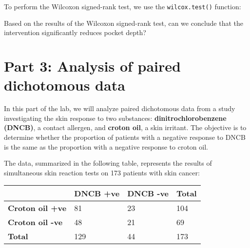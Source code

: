 \documentclass[
  letterpaper,
  DIV=11,
  numbers=noendperiod]{scrartcl}
\newenvironment{Shaded}{\begin{snugshade}}{\end{snugshade}}
\newcommand{\AttributeTok}[1]{\textcolor[rgb]{0.40,0.45,0.13}{#1}}
\newcommand{\CommentTok}[1]{\textcolor[rgb]{0.37,0.37,0.37}{#1}}
\newcommand{\ConstantTok}[1]{\textcolor[rgb]{0.56,0.35,0.01}{#1}}
\newcommand{\FunctionTok}[1]{\textcolor[rgb]{0.28,0.35,0.67}{#1}}
\newcommand{\NormalTok}[1]{\textcolor[rgb]{0.00,0.23,0.31}{#1}}
\newcommand{\OtherTok}[1]{\textcolor[rgb]{0.00,0.23,0.31}{#1}}
\newcommand{\SpecialCharTok}[1]{\textcolor[rgb]{0.37,0.37,0.37}{#1}}
\begin{document}
To perform the Wilcoxon signed-rank test, we use the
\texttt{wilcox.test()} function:

\begin{Shaded}
\end{Shaded}

\begin{tcolorbox}[enhanced jigsaw, bottomrule=.15mm, coltitle=black, colbacktitle=quarto-callout-important-color!10!white, left=2mm, bottomtitle=1mm, breakable, colframe=quarto-callout-important-color-frame, toprule=.15mm, titlerule=0mm, title={Question 13}, opacitybacktitle=0.6, arc=.35mm, rightrule=.15mm, opacityback=0, leftrule=.75mm, toptitle=1mm, colback=white]

Based on the results of the Wilcoxon signed-rank test, can we conclude
that the intervention significantly reduces pocket depth?

\end{tcolorbox}

\section{Part 3: Analysis of paired dichotomous
data}\label{part-3-analysis-of-paired-dichotomous-data}

In this part of the lab, we will analyze paired dichotomous data from a
study investigating the skin response to two substances:
\textbf{dinitrochlorobenzene (DNCB)}, a contact allergen, and
\textbf{croton oil}, a skin irritant. The objective is to determine
whether the proportion of patients with a negative response to DNCB is
the same as the proportion with a negative response to croton oil.

The data, summarized in the following table, represents the results of
simultaneous skin reaction tests on 173 patients with skin cancer:

\begin{longtable}[]{@{}llll@{}}
\toprule\noalign{}
& DNCB +ve & DNCB -ve & Total \\
\midrule\noalign{}
\endhead
\bottomrule\noalign{}
\endlastfoot
\textbf{Croton oil +ve} & 81 & 23 & 104 \\
\textbf{Croton oil -ve} & 48 & 21 & 69 \\
\textbf{Total} & 129 & 44 & 173 \\
\end{longtable}
\end{document}
